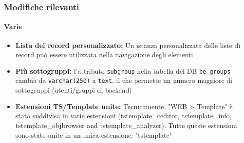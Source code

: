 \begin{frame}[fragile]
	\frametitle{Modifiche rilevanti}
	\framesubtitle{Varie}

	\begin{itemize}

		\item \textbf{Lista dei record personalizzato:}\newline
			\small
				Un istanza personalizzata delle liste di record può essere utilizzata nella navigazione degli elementi
			\normalsize

		\item \textbf{Più sottogruppi:}\newline
			\small
				l'attributo \texttt{subgroup} nella tabella del DB \texttt{be\_groups} cambia da \texttt{varchar(250)} a \texttt{text}, il che permette un numero maggiore di sottogruppi (utenti/gruppi di backend)
			\normalsize

		\item \textbf{Estensioni TS/Template unite:}\newline
			\small
				Tecnicamente, "WEB > Template" è stata suddivisa in varie estensioni (tstemplate\_ceditor, tstemplate\_info, tstemplate\_objbrowser and tstemplate\_analyzer). Tutte queste estensioni sono state unite in un unica estensione: "tstemplate"
			\normalsize

	\end{itemize}
	
\end{frame}


